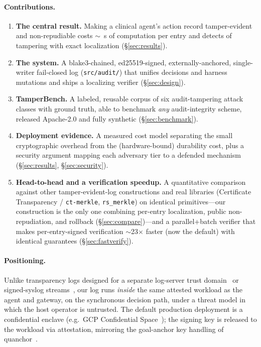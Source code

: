 \documentclass[11pt]{article}
\begin{document}
\paragraph{Contributions.}
\begin{enumerate}
  \item \textbf{The central result.} Making a clinical agent's action record
  tamper-evident and non-repudiable costs $\sim$\ComputeUs~\textmu s of computation
  per entry and detects \TDR{} of tampering with exact localization
  (\S\ref{sec:results}).
  \item \textbf{The system.} A blake3-chained, ed25519-signed, externally-anchored,
  single-writer fail-closed log (\texttt{src/audit/}) that unifies decisions and
  harness mutations and ships a localizing verifier (\S\ref{sec:design}).
  \item \textbf{TamperBench.} A labeled, reusable corpus of six audit-tampering
  attack classes with ground truth, able to benchmark \emph{any} audit-integrity
  scheme, released Apache-2.0 and fully synthetic (\S\ref{sec:benchmark}).
  \item \textbf{Deployment evidence.} A measured cost model separating the small
  cryptographic overhead from the (hardware-bound) durability cost, plus a security
  argument mapping each adversary tier to a defended mechanism (\S\ref{sec:results},
  \S\ref{sec:security}).
  \item \textbf{Head-to-head and a verification speedup.} A quantitative comparison against other
  tamper-evident-log constructions and real libraries (Certificate Transparency / \texttt{ct-merkle},
  \texttt{rs\_merkle}) on identical primitives---our construction is the only one combining per-entry
  localization, public non-repudiation, and rollback (\S\ref{sec:compare})---and a parallel+batch verifier
  that makes per-entry-signed verification $\sim$23$\times$ faster (now the default) with identical
  guarantees (\S\ref{sec:fastverify}).
\end{enumerate}

\paragraph{Positioning.} Unlike transparency logs designed for a separate
log-server trust domain~\cite{rfc6962,trillian} or signed-syslog
streams~\cite{rsyslogsign}, our log runs \emph{inside} the same attested workload as
the agent and gateway, on the synchronous decision path, under a threat model in
which the host operator is untrusted. The default production deployment is a
confidential enclave (e.g.\ GCP Confidential Space~\cite{confidentialspace}); the
signing key is released to the workload via attestation, mirroring the goal-anchor
key handling of quanchor~\cite{pristineweights2026,teepartition2023}.
\end{document}
